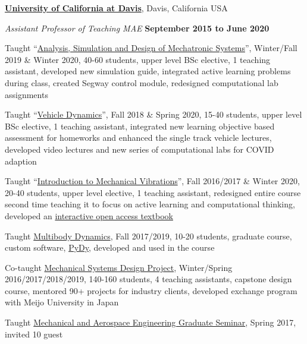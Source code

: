 \documentclass[10pt]{article}
\newenvironment{outerlist}[1][\enskip\textbullet]%
        {\begin{itemize}[#1]}{\end{itemize}%
         \vspace{-.6\baselineskip}}
\newenvironment{innerlist}[1][\enskip\textbullet]%
        {\begin{compactitem}[#1]}{\end{compactitem}}
\begin{document}
\href{http://www.ucdavis.edu}{\textbf{University of California at Davis}}, Davis, California USA
\begin{outerlist}
  \item[] \textit{Assistant Professor of Teaching MAE}%
    \hfill \textbf{September 2015 to June 2020}
    \begin{innerlist}
      \item Taught ``\href{https://moorepants.github.io/eme171/}{Analysis,
        Simulation and Design of Mechatronic Systems}'', Winter/Fall 2019 \&
        Winter 2020, 40-60 students, upper level BSc elective, 1 teaching
        assistant, developed new simulation guide, integrated active learning
        problems during class, created Segway control module, redesigned
        computational lab assignments
      \item Taught ``\href{https://moorepants.github.io/eme134/}{Vehicle
        Dynamics}'', Fall 2018 \& Spring 2020, 15-40 students, upper level
        BSc elective, 1 teaching assistant, integrated new learning objective based
        assessment for homeworks and enhanced the single track vehicle
        lectures, developed video lectures and new series of computational labs
        for COVID adaption
      \item Taught ``\href{https://moorepants.github.io/eng122/}{Introduction
        to Mechanical Vibrations}'', Fall 2016/2017 \& Winter 2020, 20-40
        students, upper level elective, 1 teaching assistant, redesigned entire
        course second time teaching it to focus on active learning and
        computational thinking, developed an
        \href{https://moorepants.github.io/resonance/}{interactive open access
        textbook}
      \item Taught \href{https://moorepants.github.io/mae223/}{Multibody
        Dynamics}, Fall 2017/2019, 10-20 students, graduate course, custom
        software, \href{http://pydy.org}{PyDy}, developed and used in the
        course
      \item Co-taught \href{https://moorepants.github.io/eme185/}{Mechanical
        Systems Design Project}, Winter/Spring 2016/2017/2018/2019, 140-160
        students, 4 teaching assistants, capstone design course, mentored 90+
        projects for industry clients, developed exchange program with Meijo
        University in Japan
      \item Taught \href{https://moorepants.github.io/mae297/}{Mechanical and
        Aerospace Engineering Graduate Seminar}, Spring 2017, invited 10 guest

\end{innerlist}
\end{outerlist}
\end{document}
